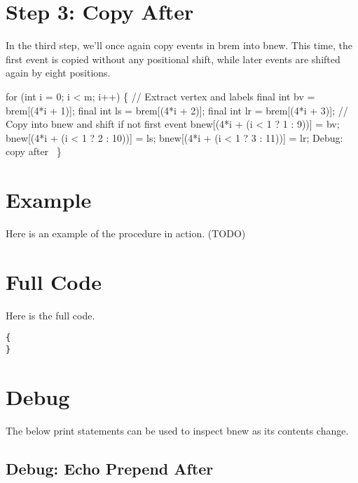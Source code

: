 \section{Step 3: Copy After}

In the third step, we'll once again copy events in {\Tt{}brem\nwendquote} into {\Tt{}bnew\nwendquote}.
This time, the first event is copied without any positional shift, while later
events are shifted again by eight positions.

\nwenddocs{}\endmoddef\nwstartdeflinemarkup{}\nwenddeflinemarkup
for (int i = 0; i < m; i++) \{
  // Extract vertex and labels
  final int bv = brem[(4*i + 1)];
  final int ls = brem[(4*i + 2)];
  final int lr = brem[(4*i + 3)];
  // Copy into bnew and shift if not first event
  bnew[(4*i + (i < 1 ? 1 :  9))] = bv;
  bnew[(4*i + (i < 1 ? 2 : 10))] = ls;
  bnew[(4*i + (i < 1 ? 3 : 11))] = lr;
  \LA{}Debug: copy after~{\nwtagstyle{}}\RA{}
\}
\nwendcode{}\nwdocspar

\section{Example}

Here is an example of the procedure in action. (TODO)

\section{Full Code}

Here is the full code.

\begin{verbatim}
{
}
\end{verbatim}

\section{Debug}

The below print statements can be used to inspect {\Tt{}bnew\nwendquote} as its contents
change.

\subsection{Debug: Echo Prepend After}

